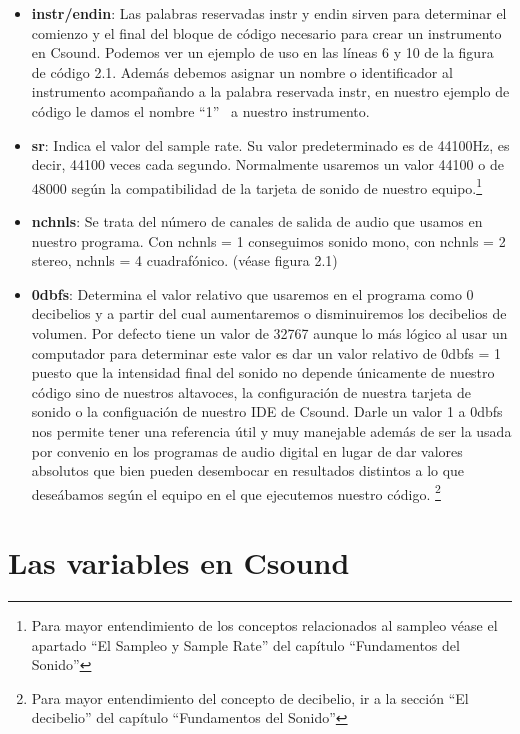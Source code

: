 \begin{itemize}
 \item \textbf{instr/endin}: Las palabras reservadas instr y endin sirven para determinar el comienzo y el final del bloque de código necesario para crear un instrumento en Csound. Podemos ver un ejemplo de uso en las líneas 6 y 10 de la figura de código 2.1.
 Además debemos asignar un nombre o identificador al instrumento acompañando a la palabra reservada instr, en nuestro ejemplo de código le damos el nombre ``1'' \ a nuestro instrumento.
 
 \item \textbf{sr}: Indica el valor del sample rate. Su valor predeterminado es de 44100Hz, es decir, 44100 veces cada segundo. Normalmente usaremos un valor 44100 o de 48000 según la compatibilidad de la tarjeta de sonido de nuestro equipo.\footnote{Para mayor entendimiento de los conceptos relacionados al sampleo véase el apartado ``El Sampleo y Sample Rate'' del capítulo ``Fundamentos del Sonido''}
 
 \item \textbf{nchnls}: Se trata del número de canales de salida de audio que usamos en nuestro programa. Con nchnls = 1 conseguimos sonido mono, con nchnls = 2 stereo, nchnls = 4 cuadrafónico. (véase figura 2.1)

 \item \textbf{0dbfs}: Determina el valor relativo que usaremos en el programa como 0 decibelios y a partir del cual aumentaremos o disminuiremos los decibelios de volumen. Por defecto tiene un valor de 32767 aunque lo más lógico al usar un computador para determinar este valor es dar un valor relativo de 0dbfs = 1 puesto que la intensidad final del sonido no depende únicamente de nuestro código sino de nuestros altavoces, la configuración de nuestra tarjeta de sonido o la configuación de nuestro IDE de Csound. Darle un valor 1 a 0dbfs nos permite tener una referencia útil y muy manejable además de ser la usada por convenio en los programas de audio digital en lugar de dar valores absolutos que bien pueden desembocar en resultados distintos a lo que deseábamos según el equipo en el que ejecutemos nuestro código. \footnote{Para mayor entendimiento del concepto de decibelio, ir a la sección ``El decibelio''  del capítulo ``Fundamentos del Sonido''}
\end{itemize}

\section{Las variables en Csound}\label{sec:variables}

